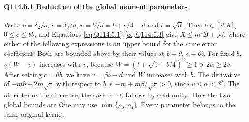 \paragraph{Q114.5.1 Reduction of the global moment parameters}\label{part:Q114.5.1}
Write $b=\allowbreak \delta_2/d$, $c=\allowbreak \delta_3/d$, $v=\allowbreak V/d=\allowbreak b+c/4-d$ and $t=\allowbreak \sqrt d$.
Then $b\in[d,\allowbreak \theta]$, $0\le\allowbreak  c\le\allowbreak \theta b$, and
Equations \eqref{eq:Q114:5.1}--\eqref{eq:Q114:5.3} give
$X\le\allowbreak  m^2\mathcal B+\rho d$, where either of the following expressions
is an upper bound for the same error coefficient:
Both are bounded above by their values at $b=\allowbreak \theta$, $c=\allowbreak \theta b$.
For fixed $b$, $v(W-v)$ increases with $v$, because
$W=\allowbreak (t+\sqrt{1+b/4})^2\ge\allowbreak 1>\allowbreak 2\alpha\ge\allowbreak 2v$.
After setting $c=\allowbreak \theta b$, we have $v=\allowbreak \beta b-d$ and $W$ increases with $b$.
The derivative of $-mb+2m\sqrt v$ with respect to $b$ is
$-m+m\beta/\sqrt v>\allowbreak 0$, since $v\le\allowbreak \alpha<\allowbreak \beta^2$.
The other terms also increase; the case $v=\allowbreak 0$ follows by continuity.
Thus the two global bounds are
One may use $\min\{\rho_2,\allowbreak \rho_4\}$. Every parameter belongs to the
same original kernel. 

